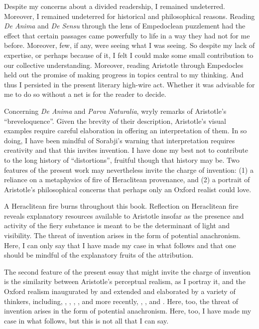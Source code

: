 Despite my concerns about a divided readership, I remained undeterred. Moreover, I remained undeterred for historical and philosophical reasons. Reading \emph{De Anima} and \emph{De Sensu} through the lens of Empedoclean puzzlement had the effect that certain passages came powerfully to life in a way they had not for me before. Moreover, few, if any, were seeing what I was seeing. So despite my lack of expertise, or perhaps because of it, I felt I could make some small contribution to our collective understanding. Moreover, reading Aristotle through Empedocles held out the promise of making progress in topics central to my thinking. And thus I persisted in the present literary high-wire act. Whether it was advisable for me to do so without a net is for the reader to decide.

Concerning \emph{De Anima} and \emph{Parva Naturalia}, \citet[vii]{Hammond:1902kx} wryly remarks of Aristotle's ``breveloquence''. Given the brevity of their description, Aristotle's visual examples require careful elaboration in offering an interpretation of them. In so doing, I have been mindful of Sorabji's \citeyearpar[225]{Sorabji:2003fk} warning that interpretation requires creativity and that this invites invention. I have done my best not to contribute to the long history of ``distortions'', fruitful though that history may be. Two features of the present work may nevertheless invite the charge of invention: (1) a reliance on a metaphysics of fire of Heraclitean provenance, and (2) a portrait of Aristotle's philosophical concerns that perhaps only an Oxford realist could love. 

A Heraclitean fire burns throughout this book. Reflection on Heraclitean fire reveals explanatory resources available to Aristotle insofar as the presence and activity of the fiery substance is meant to be the determinant of light and visibility. The threat of invention arises in the form of potential anachronism. Here, I can only say that I have made my case in what follows and that one should be mindful of the explanatory fruits of the attribution. 

The second feature of the present essay that might invite the charge of invention is the similarity between Aristotle's perceptual realism, as I portray it, and the Oxford realism inaugurated by \citet{Cook-Wilson:1926sf} and extended and elaborated by a variety of thinkers, including, \citet{Prichard:1909yg,Prichard:1950kx}, \citet{Ryle:1949qr}, \citet{Austin:1961bs,Austin:1962lr}, \citet{Hinton:1973js}, and more recently, \citet{McDowell:1994am}, \citet{Travis:2008la}, and \citet{Williamson:2000lr}. Here, too, the threat of invention arises in the form of potential anachronism. Here, too, I have made my case in what follows, but this is not all that I can say. 

